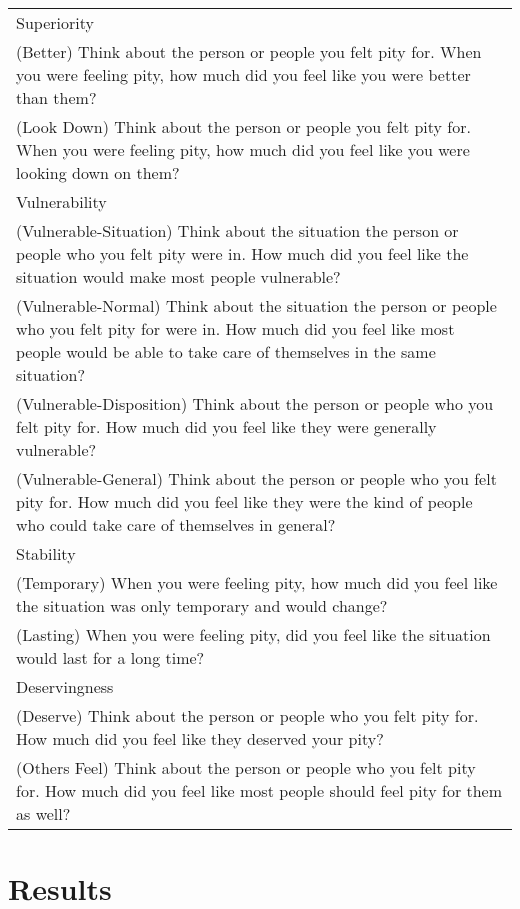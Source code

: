 \documentclass[man]{apa6}
\begin{document}
\begin{table}
\begin{tabular}{p{16cm}}
Superiority \\
\hspace{1cm}(Better) Think about the person or people you felt pity for. When you were feeling pity, how much did you feel like you were better than them? \\
\hspace{1cm}(Look Down) Think about the person or people you felt pity for. When you were feeling pity, how much did you feel like you were looking down on them? \\
Vulnerability \\
\hspace{1cm}(Vulnerable-Situation) Think about the situation the person or people who you felt pity were in. How much did you feel like the situation would make most people vulnerable? \\
\hspace{1cm}(Vulnerable-Normal) Think about the situation the person or people who you felt pity for were in. How much did you feel like most people would be able to take care of themselves in the same situation? \\
\hspace{1cm}(Vulnerable-Disposition) Think about the person or people who you felt pity for. How much did you feel like they were generally vulnerable? \\
\hspace{1cm}(Vulnerable-General) Think about the person or people who you felt pity for. How much did you feel like they were the kind of people who could take care of themselves in general? \\
Stability \\
\hspace{1cm}(Temporary) When you were feeling pity, how much did you feel like the situation was only temporary and would change? \\
\hspace{1cm}(Lasting) When you were feeling pity, did you feel like the situation would last for a long time? \\
Deservingness \\
\hspace{1cm}(Deserve) Think about the person or people who you felt pity for. How much did you feel like they deserved your pity? \\
\hspace{1cm}(Others Feel) Think about the person or people who you felt pity for. How much did you feel like most people should feel pity for them as well? \\
\end{tabular}
\end{table}



\section {Results}
\end{document}
